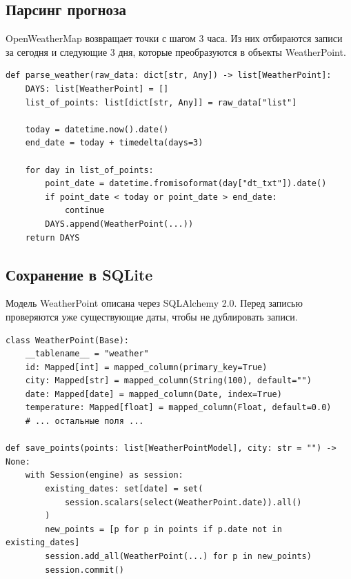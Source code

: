 \documentclass[oneside,a4paper,14pt]{extarticle}
\begin{document}
\subsection*{Парсинг прогноза}
OpenWeatherMap возвращает точки с шагом 3 часа. Из них отбираются записи за сегодня и следующие 3 дня, которые преобразуются в объекты WeatherPoint.

\begin{small}
	\begin{verbatim}
def parse_weather(raw_data: dict[str, Any]) -> list[WeatherPoint]:
    DAYS: list[WeatherPoint] = []
    list_of_points: list[dict[str, Any]] = raw_data["list"]

    today = datetime.now().date()
    end_date = today + timedelta(days=3)

    for day in list_of_points:
        point_date = datetime.fromisoformat(day["dt_txt"]).date()
        if point_date < today or point_date > end_date:
            continue
        DAYS.append(WeatherPoint(...))
    return DAYS
\end{verbatim}
\end{small}

\subsection*{Сохранение в SQLite}
Модель WeatherPoint описана через SQLAlchemy 2.0. Перед записью проверяются уже существующие даты, чтобы не дублировать записи.

\begin{small}
	\begin{verbatim}
class WeatherPoint(Base):
    __tablename__ = "weather"
    id: Mapped[int] = mapped_column(primary_key=True)
    city: Mapped[str] = mapped_column(String(100), default="")
    date: Mapped[date] = mapped_column(Date, index=True)
    temperature: Mapped[float] = mapped_column(Float, default=0.0)
    # ... остальные поля ...

def save_points(points: list[WeatherPointModel], city: str = "") -> None:
    with Session(engine) as session:
        existing_dates: set[date] = set(
            session.scalars(select(WeatherPoint.date)).all()
        )
        new_points = [p for p in points if p.date not in existing_dates]
        session.add_all(WeatherPoint(...) for p in new_points)
        session.commit()
\end{verbatim}
\end{small}
\end{document}
